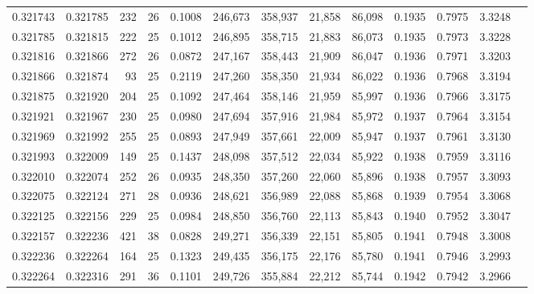 \begin{tabular}{rrrrrrrrrrrrr}
0.321743 & 0.321785 &   232 &  26 &                                     0.1008 & 246,673 & 358,937 &  21,858 &  86,098 & 0.1935 & 0.7975 & 3.3248 \\
0.321785 & 0.321815 &   222 &  25 &                                     0.1012 & 246,895 & 358,715 &  21,883 &  86,073 & 0.1935 & 0.7973 & 3.3228 \\
0.321816 & 0.321866 &   272 &  26 &                                     0.0872 & 247,167 & 358,443 &  21,909 &  86,047 & 0.1936 & 0.7971 & 3.3203 \\
0.321866 & 0.321874 &    93 &  25 &                                     0.2119 & 247,260 & 358,350 &  21,934 &  86,022 & 0.1936 & 0.7968 & 3.3194 \\
0.321875 & 0.321920 &   204 &  25 &                                     0.1092 & 247,464 & 358,146 &  21,959 &  85,997 & 0.1936 & 0.7966 & 3.3175 \\
0.321921 & 0.321967 &   230 &  25 &                                     0.0980 & 247,694 & 357,916 &  21,984 &  85,972 & 0.1937 & 0.7964 & 3.3154 \\
0.321969 & 0.321992 &   255 &  25 &                                     0.0893 & 247,949 & 357,661 &  22,009 &  85,947 & 0.1937 & 0.7961 & 3.3130 \\
0.321993 & 0.322009 &   149 &  25 &                                     0.1437 & 248,098 & 357,512 &  22,034 &  85,922 & 0.1938 & 0.7959 & 3.3116 \\
0.322010 & 0.322074 &   252 &  26 &                                     0.0935 & 248,350 & 357,260 &  22,060 &  85,896 & 0.1938 & 0.7957 & 3.3093 \\
0.322075 & 0.322124 &   271 &  28 &                                     0.0936 & 248,621 & 356,989 &  22,088 &  85,868 & 0.1939 & 0.7954 & 3.3068 \\
0.322125 & 0.322156 &   229 &  25 &                                     0.0984 & 248,850 & 356,760 &  22,113 &  85,843 & 0.1940 & 0.7952 & 3.3047 \\
0.322157 & 0.322236 &   421 &  38 &                                     0.0828 & 249,271 & 356,339 &  22,151 &  85,805 & 0.1941 & 0.7948 & 3.3008 \\
0.322236 & 0.322264 &   164 &  25 &                                     0.1323 & 249,435 & 356,175 &  22,176 &  85,780 & 0.1941 & 0.7946 & 3.2993 \\
0.322264 & 0.322316 &   291 &  36 &                                     0.1101 & 249,726 & 355,884 &  22,212 &  85,744 & 0.1942 & 0.7942 & 3.2966 \\

\end{tabular}
